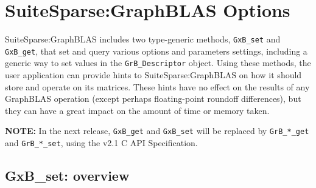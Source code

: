\documentclass[12pt]{article}
\begin{document}
\newpage
\section{SuiteSparse:GraphBLAS Options} %
\label{options}

SuiteSparse:GraphBLAS includes two type-generic methods, \verb'GxB_set' and
\verb'GxB_get', that set and query various options and parameters settings,
including a generic way to set values in the \verb'GrB_Descriptor' object.
Using these methods, the user application can provide hints to
SuiteSparse:GraphBLAS on how it should store and operate on its matrices.
These hints have no effect on the results of any GraphBLAS operation (except
perhaps floating-point roundoff differences), but they can have a great impact
on the amount of time or memory taken.

\begin{note}
{\bf NOTE:} In the next release, \verb'GxB_get' and \verb'GxB_set' will be
replaced by \verb'GrB_*_get' and \verb'GrB_*_set', using the v2.1 C API
Specification.
\end{note}

\subsection{{\sf GxB\_set}: overview}
\end{document}
